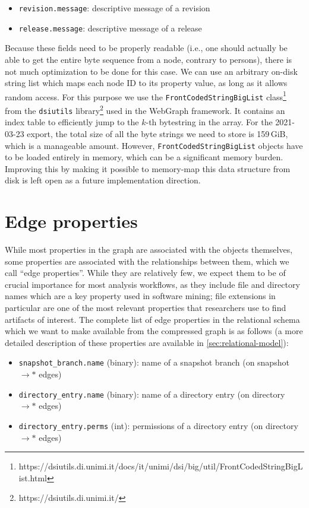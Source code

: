 \begin{itemize}
    \setlength\itemsep{0em}
    \item \texttt{revision.message}: descriptive message of a revision
    \item \texttt{release.message}: descriptive message of a release
\end{itemize}

Because these fields need to be properly readable (i.e., one should actually be
able to get the entire byte sequence from a node, contrary to persons), there
is not much optimization to be done for this case. We can use an arbitrary
on-disk string list which maps each node ID to its property value, as long as
it allows random access. For this purpose we use the
\texttt{FrontCodedStringBigList}
class\footnote{https://dsiutils.di.unimi.it/docs/it/unimi/dsi/big/util/FrontCodedStringBigList.html}
from the \texttt{dsiutils} library\footnote{https://dsiutils.di.unimi.it/} used
in the WebGraph framework. It contains an index table to efficiently jump to
the $k$-th bytestring in the array.
For the 2021-03-23 export, the total size of all the byte strings we need to
store is 159\,GiB, which is a manageable amount.  However,
\texttt{FrontCodedStringBigList} objects have to be loaded entirely in memory,
which can be a significant memory burden. Improving this by making it possible
to memory-map this data structure from disk is left open as a future
implementation direction.

\section{Edge properties}%
\label{sec:mapping-edge-labels}

While most properties in the graph are associated with the objects themselves,
some properties are associated with the relationships between them, which we
call ``edge properties''. While they are relatively few, we expect them to be
of crucial importance for most analysis workflows, as they include file and
directory names which are a key property used in software mining; file
extensions in particular are one of the most relevant properties that
researchers use to find artifacts of interest. The complete list of edge
properties in the relational schema which we want to make available from the
compressed graph is as follows (a more detailed description of these properties
are available in \cref{sec:relational-model}):

\begin{itemize}
    \setlength\itemsep{0em}
\item \texttt{snapshot\_branch.name} (binary): name of a snapshot branch
    (on snapshot $\to\ast$ edges)
\item \texttt{directory\_entry.name} (binary): name of a directory entry
    (on directory $\to\ast$ edges)
\item \texttt{directory\_entry.perms} (int): permissions of a directory
    entry (on directory $\to\ast$ edges)
\end{itemize}

